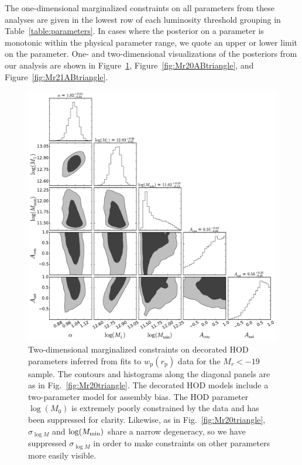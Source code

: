 \documentclass[usenatbib,usegraphicx,letterpaper]{mn2e}
\newcommand{\wprp}{w_{\mathrm{p}}}
\newcommand{\rp}{r_{\mathrm{p}}}
\begin{document}
The one-dimensional marginalized constraints on all parameters from these analyses 
are given in the lowest row of each luminosity threshold grouping in Table~\ref{table:parameters}. 
In cases where the posterior on a parameter is monotonic within the physical parameter 
range, we quote an upper or lower limit on the parameter. One- and two-dimensional 
visualizations of the posteriors from our analysis are shown in Figure~\ref{fig:Mr19ABtriangle}, 
Figure~\ref{fig:Mr20ABtriangle}, and Figure~\ref{fig:Mr21ABtriangle}. 


\begin{figure}
\begin{center}
\includegraphics[width=15.0cm]{Mr19ABTri.pdf}
\caption{ Two-dimensional marginalized constraints on decorated HOD
  parameters inferred from fits to $\wprp(\rp)$ data for the $M_r<-19$
  sample. The contours and histograms along the diagonal panels are as
  in Fig.~\ref{fig:Mr20triangle}. The decorated HOD models include a
  two-parameter model for assembly bias. The HOD parameter $\log
  (M_0)$ is extremely poorly constrained by the data and has been
  suppressed for clarity. Likewise, as in Fig.~\ref{fig:Mr20triangle},
  $\sigma_{\log M}$ and $\log (M_{\rm min})$ share a narrow
  degeneracy, so we have suppressed $\sigma_{\log M}$ in order to make
  constraints on other parameters more easily visible.  }
\label{fig:Mr19ABtriangle}
\end{center}
\end{figure}
\end{document}
